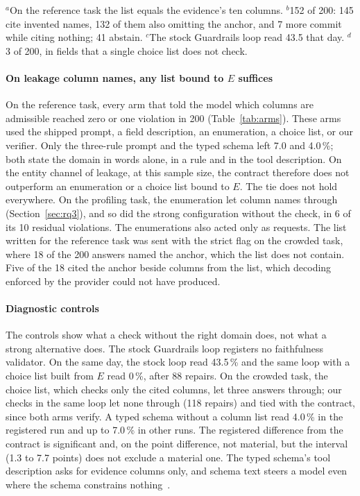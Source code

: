 \documentclass[journal]{IEEEtran}
\begin{document}
\begin{table}[!t]
\vspace{2pt}
{\scriptsize\raggedright $^{a}$On the reference task the list equals the
evidence's ten columns. $^{b}$152 of 200: 145 cite invented names, 132 of them
also omitting the anchor, and 7 more commit while citing nothing; 41 abstain.
$^{c}$The stock Guardrails loop read 43.5 that day. $^{d}$3 of 200, in fields
that a single choice list does not check.\par}
\end{table}

\paragraph{On leakage column names, any list bound to $E$ suffices}
On the reference task, every arm that told the model which columns are
admissible reached zero or one violation in 200 (Table~\ref{tab:arms}). These
arms used the shipped prompt, a field description, an enumeration, a choice list,
or our verifier. Only the three-rule prompt and the typed schema left 7.0 and
4.0\,\%; both state the domain in words alone, in a rule and in the tool
description. On the entity channel of leakage, at this sample size, the contract
therefore does not outperform an enumeration or a choice list bound to $E$. The
tie does not hold everywhere. On the profiling task, the enumeration let column
names through (Section~\ref{sec:rq3}), and so did the strong configuration
without the check, in 6 of its 10 residual violations. The enumerations also
acted only as requests. The list written for the reference task was sent with
the strict flag on the crowded task, where 18 of the 200 answers named the
anchor, which the list does not contain. Five of the 18 cited the anchor beside
columns from the list, which decoding enforced by the provider could not have
produced.

\paragraph{Diagnostic controls}
The controls show what a check without the right domain does, not what a strong
alternative does. The stock Guardrails loop registers no faithfulness validator.
On the same day, the stock loop read 43.5\,\% and the same loop with a choice
list built from $E$ read 0\,\%, after 88 repairs. On the crowded task, the choice
list, which checks only the cited columns, let three answers through; our checks
in the same loop let none through (118 repairs) and tied with the contract, since
both arms verify. A typed schema without a column list read 4.0\,\% in the
registered run and up to 7.0\,\% in other runs. The registered difference from
the contract is significant and, on the point difference, not material, but the
interval (1.3 to 7.7 points) does not exclude a material one. The typed schema's
tool description asks for evidence columns only, and schema text steers a model
even where the schema constrains nothing~\cite{le2026schemakey}.
\end{document}
